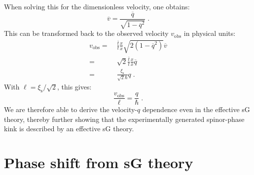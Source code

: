 \documentclass[aps,

               pra,
               twocolumn,
               amsmath,
               amssymb,
               superscriptaddress,
               reprint,
               10pt
              ]{revtex4-2}
\begin{document}
\begin{appendix}
\begin{equation}
\end{equation}
When solving this for the dimensionless velocity, one obtains:
\begin{equation}
    \overline{v}=\frac{\overline{q}}{\sqrt{1-\overline{q}^2}} \; .
\end{equation}
This can be transformed back to the observed velocity $v_{\mathrm{obs}}$ in physical units:
\begin{align}
    v_{\mathrm{obs}}= \; &\frac{\overline{t}}{t}\frac{x}{\overline{x}}\sqrt{2(1-\overline{q}^2)}\overline{v} \nonumber \\
    = \; &\sqrt{2}\frac{\overline{t}}{t}\frac{x}{\overline{x}}\overline{q} \nonumber \\
    = \; & \frac{\xi_\mathrm{s}}{\sqrt{2}\hbar}q \; .
\end{align}
With $\ell=\xi_\mathrm{s}/\sqrt{2}$, this gives:
\begin{equation}
    \frac{v_{\mathrm{obs}}}{\ell} = \frac{q}{\hbar} \; .
\end{equation}
We are therefore able to derive the velocity-$q$ dependence even in the effective sG theory, thereby further showing that the experimentally generated spinor-phase kink is described by an effective sG theory.




\section{Phase shift from sG theory}\label{app:PhaseShift}


\end{appendix}
\end{document}
